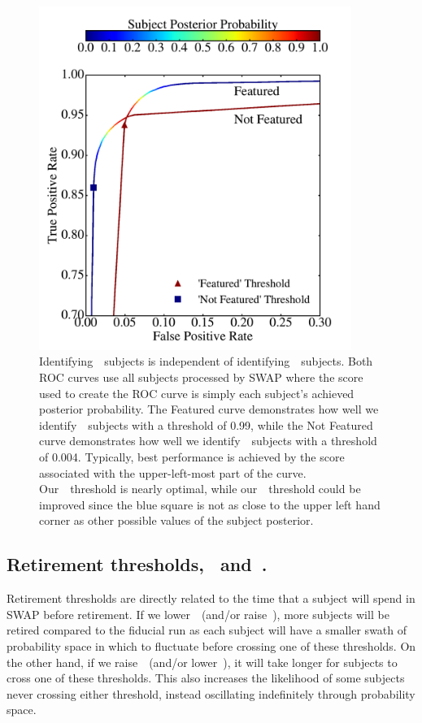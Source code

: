 \begin{figure}
\begin{center}
\includegraphics[width=4in]{Figures/human_machine/A2a.pdf}
\caption[Receiver operating characteristic curve for the chosen SWAP retirement thresholds.]{Identifying~\feat~subjects is independent of identifying~\notfeat~subjects.  Both ROC curves use all subjects processed by SWAP where the score used to create the ROC curve is simply each subject's achieved posterior probability. The Featured curve demonstrates how well we identify~\feat~subjects with a threshold of 0.99, while the Not Featured curve demonstrates how well we identify~\notfeat~subjects with a threshold of 0.004. Typically, best performance is achieved by the score associated with the upper-left-most part of the curve. Our~\feat~threshold is nearly optimal, while our~\notfeat~threshold could be improved since the blue square is not as close to the upper left hand corner as other possible values of the subject posterior.}
\label{fig: morph thresh}
\end{center}
\end{figure}

\subsection{Retirement thresholds, \tf~and~\tn.}
Retirement thresholds are directly related to the time that a subject will spend in SWAP before retirement. If we lower~\tf~(and/or raise~\tn), more subjects will be retired compared to the fiducial run as each subject will have a smaller swath of probability space in which to fluctuate before crossing one of these thresholds. On the other hand, if we raise~\tf~(and/or lower~\tn), it will take longer for subjects to cross one of these thresholds. This also increases the likelihood of some subjects never crossing either threshold, instead oscillating indefinitely through probability space.

